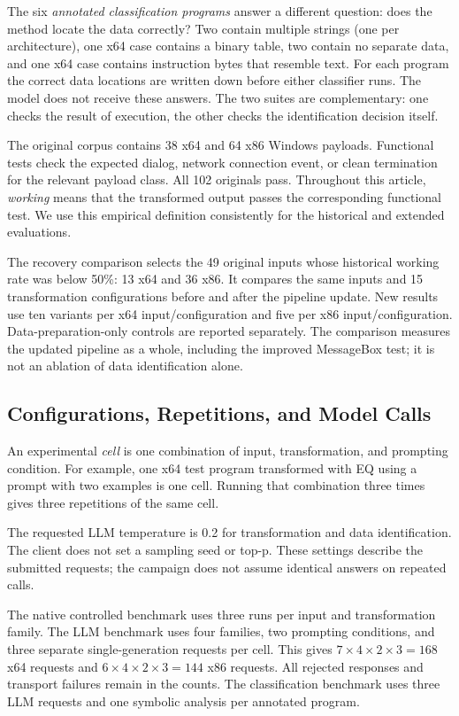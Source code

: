 The six \emph{annotated classification programs} answer a different
question: does the method locate the data correctly? Two contain multiple
strings (one per architecture), one x64 case contains a binary table,
two contain no separate data, and one x64 case contains instruction bytes
that resemble text. For each program the correct data locations are written
down before either classifier runs. The model does not receive these answers.
The two suites are complementary: one checks the result of execution,
the other checks the identification decision itself.

The original corpus contains 38 x64 and 64 x86 Windows payloads.
Functional tests check the expected dialog, network connection event,
or clean termination for the relevant payload class. All 102 originals pass.
Throughout this article, \emph{working} means that the transformed output
passes the corresponding functional test. We use this empirical definition
consistently for the historical and extended evaluations.

The recovery comparison selects the 49 original inputs whose historical
working rate was below 50\%: 13 x64 and 36 x86. It compares the same
inputs and 15 transformation configurations before and after the
pipeline update. New results use ten variants per x64 input/configuration
and five per x86 input/configuration. Data-preparation-only controls are
reported separately. The comparison measures the updated pipeline as a
whole, including the improved MessageBox test; it is not an ablation of
data identification alone.

\subsection{Configurations, Repetitions, and Model Calls}
An experimental \emph{cell} is one combination of input, transformation,
and prompting condition. For example, one x64 test program transformed
with EQ using a prompt with two examples is one cell. Running that
combination three times gives three repetitions of the same cell.

The requested LLM temperature is 0.2 for transformation and data
identification. The client does not set a sampling seed or top-p. These
settings describe the submitted requests; the campaign does not assume
identical answers on repeated calls.

The native controlled benchmark uses three runs per input and transformation
family. The LLM benchmark uses four families, two prompting conditions,
and three separate single-generation requests per cell. This gives
$7\times4\times2\times3=168$ x64 requests and
$6\times4\times2\times3=144$ x86 requests. All rejected responses and
transport failures remain in the counts. The classification benchmark uses
three LLM requests and one symbolic analysis per annotated program.

